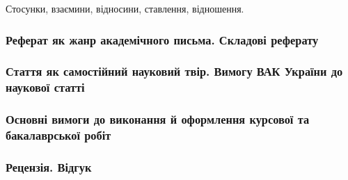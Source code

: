 \documentclass[a4paper,10pt,notitlepage,pdftex,headsepline]{scrartcl}
\begin{document}
    Стосунки, взаємини, відносини, ставлення, відношення.
    \subsubsection{Реферат як жанр академічного письма. Складові реферату}
    \subsubsection{Стаття як самостійний науковий твір. Вимогу ВАК України до
    наукової статті}
    \subsubsection{Основні вимоги до виконання й оформлення курсової та
    бакалаврської робіт}
    \subsubsection{Рецензія. Відгук}
\end{document}
